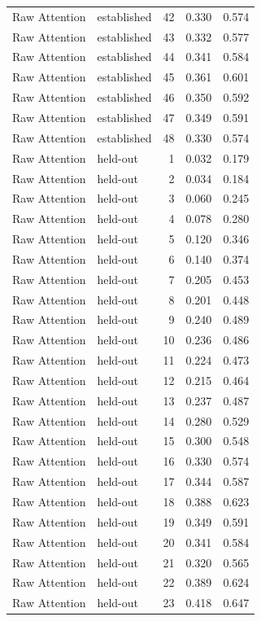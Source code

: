 \begin{tabular}{llrrr}
Raw Attention & established & 42 & 0.330 & 0.574 \\
Raw Attention & established & 43 & 0.332 & 0.577 \\
Raw Attention & established & 44 & 0.341 & 0.584 \\
Raw Attention & established & 45 & 0.361 & 0.601 \\
Raw Attention & established & 46 & 0.350 & 0.592 \\
Raw Attention & established & 47 & 0.349 & 0.591 \\
Raw Attention & established & 48 & 0.330 & 0.574 \\
Raw Attention & held-out & 1 & 0.032 & 0.179 \\
Raw Attention & held-out & 2 & 0.034 & 0.184 \\
Raw Attention & held-out & 3 & 0.060 & 0.245 \\
Raw Attention & held-out & 4 & 0.078 & 0.280 \\
Raw Attention & held-out & 5 & 0.120 & 0.346 \\
Raw Attention & held-out & 6 & 0.140 & 0.374 \\
Raw Attention & held-out & 7 & 0.205 & 0.453 \\
Raw Attention & held-out & 8 & 0.201 & 0.448 \\
Raw Attention & held-out & 9 & 0.240 & 0.489 \\
Raw Attention & held-out & 10 & 0.236 & 0.486 \\
Raw Attention & held-out & 11 & 0.224 & 0.473 \\
Raw Attention & held-out & 12 & 0.215 & 0.464 \\
Raw Attention & held-out & 13 & 0.237 & 0.487 \\
Raw Attention & held-out & 14 & 0.280 & 0.529 \\
Raw Attention & held-out & 15 & 0.300 & 0.548 \\
Raw Attention & held-out & 16 & 0.330 & 0.574 \\
Raw Attention & held-out & 17 & 0.344 & 0.587 \\
Raw Attention & held-out & 18 & 0.388 & 0.623 \\
Raw Attention & held-out & 19 & 0.349 & 0.591 \\
Raw Attention & held-out & 20 & 0.341 & 0.584 \\
Raw Attention & held-out & 21 & 0.320 & 0.565 \\
Raw Attention & held-out & 22 & 0.389 & 0.624 \\
Raw Attention & held-out & 23 & 0.418 & 0.647 \\

\end{tabular}
